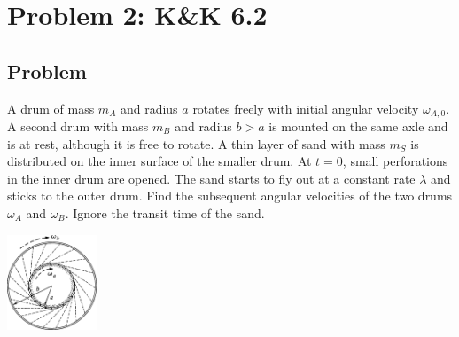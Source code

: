 \documentclass[solutions]{esg8012pset}
\begin{document}
\section*{Problem 2: K\&K 6.2}
\subsection*{Problem}
  A drum of mass $m_A$ and radius $a$ rotates freely with initial angular velocity $\omega_{A,0}$. A second drum with mass $m_B$ and radius $b > a$ is mounted on the same axle and is at rest, although it is free to rotate. A thin layer of sand with mass $m_S$ is distributed on the inner surface of the smaller drum. At $t = 0$, small perforations in the inner drum are opened. The sand starts to fly out at a constant rate $\lambda$ and sticks to the outer drum. Find the subsequent angular velocities of the two drums $\omega_A$ and $\omega_B$. Ignore the transit time of the sand.
  \begin{center}\includegraphics[width=0.2\textwidth]{ps08_1}\end{center}
\end{document}
